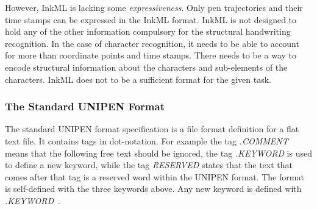However, InkML is lacking some \emph{expressiveness}. Only pen trajectories and
their time stamps can be expressed in the InkML format. InkML is not designed 
to hold any of the other information compulsory for the structural handwriting
recognition. In the case of character recognition, it needs to be able to 
account for more than coordinate points and time stamps. There needs to be a 
way to encode structural information about the characters and sub-elements of 
the characters. InkML does not to be a sufficient format for the given task.

\subsubsection{The Standard UNIPEN Format}
\label{sec:hwre:standardunipenformat}

The standard UNIPEN format specification is a file format definition for a flat
text file. It contains tags in dot-notation. For example the tag \emph{.COMMENT}
means that the following free text should be ignored, the tag \emph{.KEYWORD} 
is used to define a new keyword, while the tag \emph{RESERVED} states that
the text that comes after that tag is a reserved word within the UNIPEN format.
The format is self-defined with the three keywords above. Any new keyword is
defined with \emph{.KEYWORD}~.

